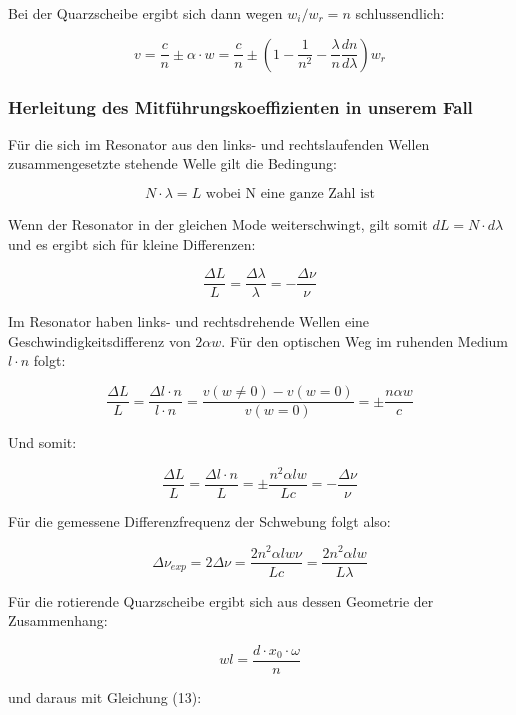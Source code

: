 Bei der Quarzscheibe ergibt sich dann wegen $w_i / w_r = n$ schlussendlich:

\begin{equation}
\boxed{v = \frac{c}{n} \pm \alpha\cdot w = \frac{c}{n} \pm \left(1 - \frac{1}{n^2} - \frac{\lambda}{n}\frac{dn}{d\lambda} \right)w_r}
\end{equation}

\subsubsection{Herleitung des Mitführungskoeffizienten in unserem Fall}

Für die sich im Resonator aus den links- und rechtslaufenden Wellen zusammengesetzte stehende Welle gilt die Bedingung: 

$$ N\cdot \lambda = L \text{ \ \ wobei N eine ganze Zahl ist} $$

Wenn der Resonator in der gleichen Mode weiterschwingt, gilt somit $dL = N\cdot d\lambda$ und es ergibt sich für kleine Differenzen:

$$\frac{\Delta L}{L} = \frac{\Delta\lambda}{\lambda} = -\frac{\Delta\nu}{\nu} $$

Im Resonator haben links- und rechtsdrehende Wellen eine Geschwindigkeitsdifferenz von $2\alpha w$. Für den optischen Weg im ruhenden Medium $l\cdot n$ folgt:

$$\frac{\Delta L}{L} = \frac{\Delta l\cdot n}{l\cdot n} = \frac{v(w \neq 0)-v(w = 0)}{v(w=0)} = \pm \frac{n\alpha w}{c} $$

Und somit:

\begin{equation} \frac{\Delta L}{L} = \frac{\Delta l\cdot n}{L} = \pm \frac{n^2\alpha lw}{Lc} = -\frac{\Delta \nu}{\nu} \end{equation}

Für die gemessene Differenzfrequenz der Schwebung folgt also:

\begin{equation}
\Delta \nu_{exp} = 2 \Delta \nu = \frac{2n^2\alpha l w \nu}{Lc} = \frac{2n^2\alpha lw}{L\lambda}
\end{equation}

Für die rotierende Quarzscheibe ergibt sich aus dessen Geometrie der Zusammenhang:

\begin{equation} wl = \frac{d\cdot x_0 \cdot \omega}{n} \end{equation}

und daraus mit Gleichung (13):

